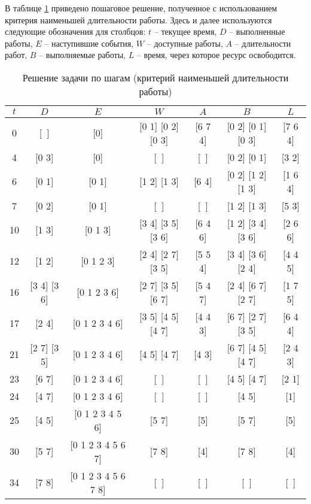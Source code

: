 В таблице \ref{tab:min-work} приведено пошаговое решение, полученное с использованием критерия наименьшей длительности работы. Здесь и далее используются следующие обозначения для столбцов: $t$ -- текущее время, $D$ -- выполненные работы, $E$ -- наступившие события, $W$ -- доступные работы, $A$ -- длительности работ, $B$ -- выполняемые работы, $L$ -- время, через которое ресурс освободится.

\begin{table}[H]
	\centering
	\def\tabcolsep{4pt}
	\caption{Решение задачи по шагам (критерий наименьшей длительности работы)}
	\label{tab:min-work}
	\begin{tabular}{|c|c|c|c|c|c|c|}
		\hline
		$t$ & $D$ & $E$ & $W$ & $A$ & $B$ & $L$ \\ \hline
		0 & [~] & [0] & [0 1] [0 2] [0 3] & [6 7 4] & [0 2] [0 1] [0 3] & [7 6 4] \\ \hline
		4 & [0 3] & [0] & [~] & [~] & [0 2] [0 1] & [3 2] \\ \hline
		6 & [0 1] & [0 1] & [1 2] [1 3] & [6 4] & [0 2] [1 2] [1 3] & [1 6 4] \\ \hline
		7 & [0 2] & [0 1] & [~] & [~] & [1 2] [1 3] & [5 3] \\ \hline
		10 & [1 3] & [0 1 3] & [3 4] [3 5] [3 6] & [6 4 6] & [1 2] [3 4] [3 6] & [2 6 6] \\ \hline
		12 & [1 2] & [0 1 2 3] & [2 4] [2 7] [3 5] & [5 5 4] & [3 4] [3 6] [2 4] & [4 4 5] \\ \hline
		16 & [3 4] [3 6] & [0 1 2 3 6] & [2 7] [3 5] [6 7] & [5 4 7] & [2 4] [6 7] [2 7] & [1 7 5] \\ \hline
		17 & [2 4] & [0 1 2 3 4 6] & [3 5] [4 5] [4 7] & [4 4 3] & [6 7] [2 7] [3 5] & [6 4 4] \\ \hline
		21 & [2 7] [3 5] & [0 1 2 3 4 6] & [4 5] [4 7] & [4 3] & [6 7] [4 5] [4 7] & [2 4 3] \\ \hline
		23 & [6 7] & [0 1 2 3 4 6] & [~] & [~] & [4 5] [4 7] & [2 1] \\ \hline
		24 & [4 7] & [0 1 2 3 4 6] & [~] & [~] & [4 5] & [1] \\ \hline
		25 & [4 5] & [0 1 2 3 4 5 6] & [5 7] & [5] & [5 7] & [5] \\ \hline
		30 & [5 7] & [0 1 2 3 4 5 6 7] & [7 8] & [4] & [7 8] & [4] \\ \hline
		34 & [7 8] & [0 1 2 3 4 5 6 7 8] & [~] & [~] & [~] & [~] \\ \hline
	\end{tabular}
\end{table}


